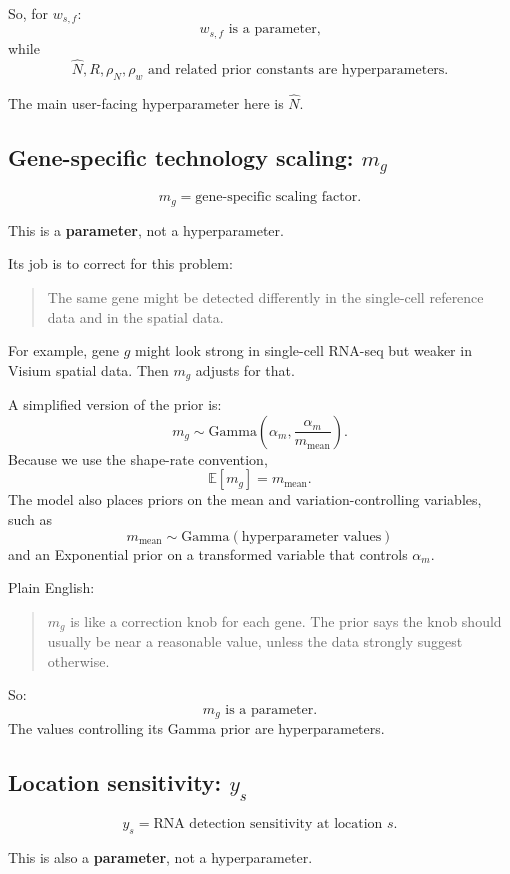 \documentclass[11pt]{article}
\newcommand{\E}{\mathbb{E}}
\newcommand{\term}[1]{\textbf{#1}}
\begin{document}
So, for $w_{s,f}$:
\[
w_{s,f}\text{ is a parameter,}
\]
while
\[
\hat N, R, \rho_N, \rho_w\text{ and related prior constants are hyperparameters.}
\]

The main user-facing hyperparameter here is $\hat N$.

\subsection{Gene-specific technology scaling: $m_g$}

\[
m_g=\text{gene-specific scaling factor}.
\]

This is a \term{parameter}, not a hyperparameter.

Its job is to correct for this problem:

\begin{quote}
The same gene might be detected differently in the single-cell reference data and in the spatial data.
\end{quote}

For example, gene $g$ might look strong in single-cell RNA-seq but weaker in Visium spatial data. Then $m_g$ adjusts for that.

A simplified version of the prior is:
\[
m_g\sim \mathrm{Gamma}\left(\alpha_m,\frac{\alpha_m}{m_{\mathrm{mean}}}\right).
\]
Because we use the shape-rate convention,
\[
\E[m_g]=m_{\mathrm{mean}}.
\]
The model also places priors on the mean and variation-controlling variables, such as
\[
m_{\mathrm{mean}}\sim \mathrm{Gamma}(\text{hyperparameter values})
\]
and an Exponential prior on a transformed variable that controls $\alpha_m$.

Plain English:

\begin{quote}
$m_g$ is like a correction knob for each gene. The prior says the knob should usually be near a reasonable value, unless the data strongly suggest otherwise.
\end{quote}

So:
\[
m_g\text{ is a parameter.}
\]
The values controlling its Gamma prior are hyperparameters.

\subsection{Location sensitivity: $y_s$}

\[
y_s=\text{RNA detection sensitivity at location }s.
\]

This is also a \term{parameter}, not a hyperparameter.
\end{document}

